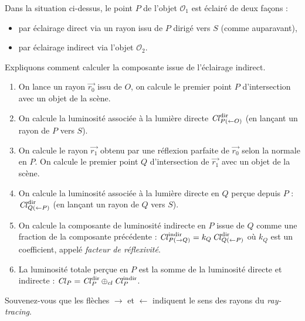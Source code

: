 \documentclass[11pt,class=report,crop=false]{standalone}
\begin{document}

Dans la situation ci-dessus, le point $P$ de l'objet $\mathcal{O}_1$ est éclairé de deux façons : 
\begin{itemize}
	\item par éclairage direct via un rayon issu de $P$ dirigé vers $S$ (comme auparavant),
	\item par éclairage indirect via l'objet $\mathcal{O}_2$.
\end{itemize}

Expliquons comment calculer la composante issue de l'éclairage indirect.

\begin{enumerate}
	\item On lance un rayon $\vec{r_0}$ issu de $O$, on calcule le premier point $P$ d'intersection avec un objet de la scène.
	
	\item On calcule la luminosité associée à la lumière directe $\operatorname{\it Cl}^{\text{dir}}_{P(\leftarrow O)}$ (en lançant un rayon de $P$ vers $S$).
	
	\item On calcule le rayon $\vec{r_1}$ obtenu par une réflexion parfaite de $\vec{r_0}$ selon la normale en $P$. On calcule le premier point $Q$ d'intersection de $\vec{r_1}$ avec un objet de la scène.
	
	\item On calcule la luminosité associée à la lumière directe en $Q$ perçue depuis $P$ : $\operatorname{\it Cl}^{\text{dir}}_{Q(\leftarrow P)}$ (en lançant un rayon de $Q$ vers $S$).	
	
	\item On calcule la composante de luminosité indirecte en $P$ issue de $Q$ comme une fraction de la composante précédente : $\operatorname{\it Cl}^{\text{indir}}_{P(\rightarrow Q)} = k_Q \operatorname{\it Cl}^{\text{dir}}_{Q(\leftarrow P)}$ où $k_Q$ est un coefficient, appelé \emph{facteur de réflexivité}.	 
	
	\item La luminosité totale perçue en $P$ est la somme de la luminosité directe et indirecte :
	$\operatorname{\it Cl}_P = \operatorname{\it Cl}^{\text{dir}}_{P} \oplus_{cl}\operatorname{\it Cl}^{\text{indir}}_{P}$.
\end{enumerate}

Souvenez-vous que les flèches \og{}$\rightarrow$\fg{} et  \og{}$\leftarrow$\fg{} indiquent le sens des rayons du \emph{ray-tracing}.


\end{document}
